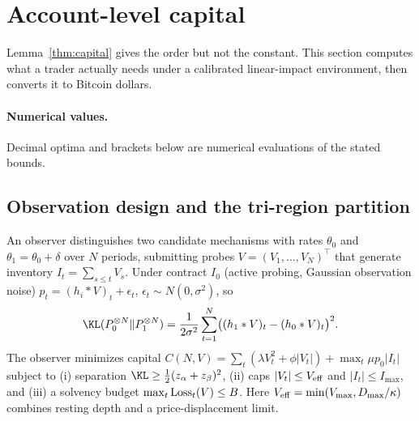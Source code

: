 \section{Account-level capital}\label{sec:account}

Lemma~\ref{thm:capital} gives the order but not the constant. This section computes what a trader actually needs under a calibrated linear-impact environment, then converts it to Bitcoin dollars.

\paragraph{Numerical values.} Decimal optima and brackets below are numerical evaluations of the stated bounds.

\subsection{Observation design and the tri-region partition}

An observer distinguishes two candidate mechanisms with rates $\theta_0$ and $\theta_1=\theta_0+\delta$ over $N$ periods, submitting probes $V=(V_1,\ldots,V_N)^\top$ that generate inventory $I_t=\sum_{s\le t}V_s$. Under contract $I_0$ (active probing, Gaussian observation noise) $p_t=(h_i*V)_t+\epsilon_t$, $\epsilon_t\sim N(0,\sigma^2)$, so
\begin{equation}\label{eq:klconv}
\KL(P_0^{\otimes N}\|P_1^{\otimes N})=\frac1{2\sigma^2}\sum_{t=1}^N\bigl((h_1*V)_t-(h_0*V)_t\bigr)^2 .
\end{equation}
The observer minimizes capital $C(N,V)=\sum_t(\lambda V_t^2+\phi|V_t|)+\max_t\mu p_0|I_t|$ subject to (i) separation $\KL\ge\tfrac12(z_\alpha+z_\beta)^2$, (ii) caps $|V_t|\le V_{\rm eff}$ and $|I_t|\le I_{\max}$, and (iii) a solvency budget $\max_t{\rm Loss}_t(V)\le B$. Here $V_{\rm eff}=\min(V_{\max},D_{\max}/\kappa)$ combines resting depth and a price-displacement limit.

